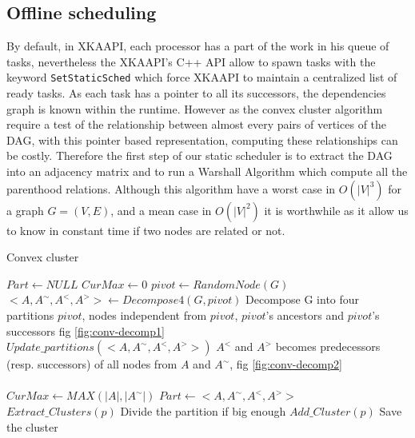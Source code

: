 \documentclass[10pt, conference, compsocconf,pdftex,dvipsnames]{IEEEtran}
\begin{document}
\subsection{Offline scheduling}
\label{sec:impl-off}
By default, in XKAAPI, each processor has a part of the work in his queue of
tasks, nevertheless the XKAAPI's C++ API allow to spawn tasks with the keyword
\texttt{SetStaticSched} which force XKAAPI to maintain a centralized list of
ready tasks. As each task has a pointer to all its successors, the
dependencies graph is known within the runtime. However as the convex cluster
algorithm require a test of the relationship between almost every pairs of
vertices of the DAG,  with this pointer based representation, computing these
relationships can be costly. Therefore the first step of our static scheduler
is to extract the DAG into an adjacency matrix and to run a Warshall Algorithm
which compute all the parenthood relations. Although this algorithm have a
worst case in $O(|V|^3)$ for a graph $G=(V,E)$, and a mean case in $O(|V|^2)$
it is worthwhile as it allow us to know in constant time if two nodes are
related or not.

\renewcommand{\algorithmiccomment}[1]{\State $\triangleright$ #1}


\begin{algorithm}[h!]
    \centering
    \caption{Convex cluster}
    \label{algo:conv-clust}
    \begin{algorithmic}[1]
        \State $Part \gets NULL$
        \State $CurMax \gets 0$
        \label{algop:main-loop}
        \State $pivot \gets RandomNode(G)$
        \State
        $<A,A^{\sim},A^<,A^>> \gets Decompose4(G,pivot)$\label{algop:init-part}
        \Comment Decompose G into four partitions 
        \Comment $pivot$, nodes independent from $pivot$, 
        \Comment $pivot$'s ancestors and $pivot$'s successors fig
        \ref{fig:conv-decomp1} 
        \\
        \State $Update\_partitions(<A,A^{\sim},A^<,A^>>)$
        \label{algop:update-part}
        \Comment $A^<$ and $A^>$ becomes predecessors 
        \Comment (resp. successors) of all nodes  
        \Comment from $A$ and $A^{\sim}$, fig 
        \ref{fig:conv-decomp2}
        \\
         \label{algop:part-choice}
        \\
        \State $CurMax \gets MAX(|A|,|A^{\sim}|)$
        \State $Part \gets <A,A^{\sim},A^<,A^>>$
        \EndIf
        \EndFor
        \label{algop:rec-stop}
        \State $Extract\_Clusters(p)$
        \Comment Divide the partition if big enough
        \Else
        \State $Add\_Cluster(p)$
        \Comment Save the cluster
        \EndIf
        \EndFor
        \EndFunction
    \end{algorithmic}
\end{algorithm}
\end{document}
